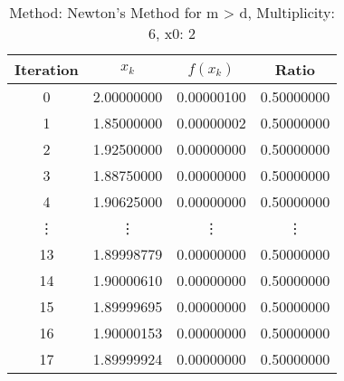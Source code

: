 \begin{table}
\centering
\caption{Method: Newton's Method for m > d, Multiplicity: 6, x0: 2}
\label{tab:table_Newton's_Method_for_m_>_d_6_2}
\begin{tabular}{c c c c}
\toprule
Iteration &      $x_k$ &   $f(x_k)$ &      Ratio \\
\midrule
        0 & 2.00000000 & 0.00000100 & 0.50000000 \\
        1 & 1.85000000 & 0.00000002 & 0.50000000 \\
        2 & 1.92500000 & 0.00000000 & 0.50000000 \\
        3 & 1.88750000 & 0.00000000 & 0.50000000 \\
        4 & 1.90625000 & 0.00000000 & 0.50000000 \\
   \vdots &     \vdots &     \vdots &     \vdots \\
       13 & 1.89998779 & 0.00000000 & 0.50000000 \\
       14 & 1.90000610 & 0.00000000 & 0.50000000 \\
       15 & 1.89999695 & 0.00000000 & 0.50000000 \\
       16 & 1.90000153 & 0.00000000 & 0.50000000 \\
       17 & 1.89999924 & 0.00000000 & 0.50000000 \\
\bottomrule
\end{tabular}
\end{table}

